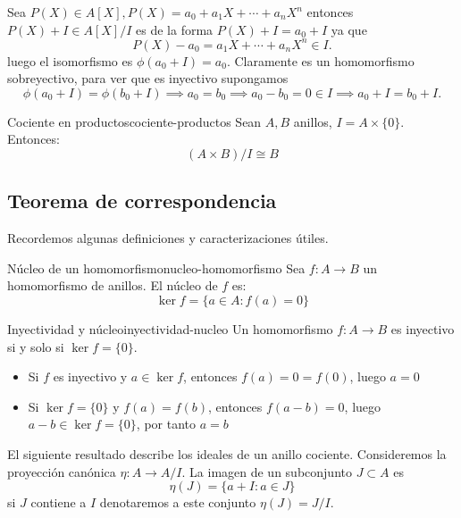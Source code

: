 \begin{proofbox}
    Sea $P(X) \in A[X], P(X) = a_0 + a_1 X + \cdots + a_n X^n$ entonces $P(X) + I \in A[X]/I$ es de la forma $P(X) + I = a_0 + I$ ya que
    \[
    P(X) - a_0 = a_1 X + \cdots + a_n X^n \in I.
    \]
    luego el isomorfismo es $\phi(a_0 + I) = a_0$. Claramente es un homomorfismo sobreyectivo, para ver que es inyectivo supongamos
    \[
    \phi(a_0 + I) = \phi(b_0 + I) \implies a_0 = b_0 \implies a_0 - b_0 = 0 \in I \implies a_0 + I = b_0 + I.
    \]
\end{proofbox}

\begin{example}{Cociente en productos}{cociente-productos}
    Sean \(A, B\) anillos, \(I = A \times \{0\}\). Entonces:
    \[
    (A \times B)/I \cong B
    \]
\end{example}

\subsection{Teorema de correspondencia}

Recordemos algunas definiciones y caracterizaciones útiles.

\begin{definition}{Núcleo de un homomorfismo}{nucleo-homomorfismo}
    Sea \(f: A \to B\) un homomorfismo de anillos. El {núcleo} de \(f\) es:
    \[
    \ker f = \{a \in A : f(a) = 0\}
    \]
\end{definition}

\begin{proposition}{Inyectividad y núcleo}{inyectividad-nucleo}
    Un homomorfismo \(f: A \to B\) es inyectivo si y solo si \(\ker f = \{0\}\).
\end{proposition}

\begin{proofbox}
    \begin{itemize}
        \item Si \(f\) es inyectivo y \(a \in \ker f\), entonces \(f(a) = 0 = f(0)\), luego \(a = 0\)
        \item Si \(\ker f = \{0\}\) y \(f(a) = f(b)\), entonces \(f(a - b) = 0\), luego \(a - b \in \ker f = \{0\}\), por tanto \(a = b\)
    \end{itemize}
\end{proofbox}

El siguiente resultado describe los ideales de un anillo cociente. Consideremos la proyección canónica $\eta : A \to A / I$. La imagen de un subconjunto $J \subset A$ es 
\[
\eta(J) = \{a + I : a \in J\}
\]
si $J$ contiene a $I$ denotaremos a este conjunto $\eta(J) = J/I$.

